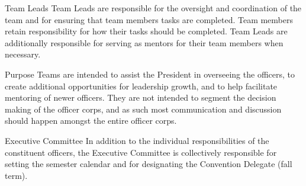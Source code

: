 \begin{enumsubsection}
\begin{enumsubsubsection}
\item{Team Leads} Team Leads are responsible for the oversight and coordination of the team and for ensuring that team members tasks are completed. Team members retain responsibility for how their tasks should be completed. Team Leads are additionally responsible for serving as mentors for their team members when necessary.
\item{Purpose} Teams are intended to assist the President in overseeing the officers, to create additional opportunities for leadership growth, and to help facilitate mentoring of newer officers. They are not intended to segment the decision making of the officer corps, and as such most communication and discussion should happen amongst the entire officer corps.
\item{Executive Committee} In addition to the individual responsibilities of the constituent officers, the Executive Committee is collectively responsible for setting the semester calendar and for designating the Convention Delegate (fall term).
\end{enumsubsubsection}
\end{enumsubsection}


